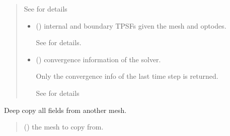 \documentclass[letterpaper,10pt,english]{sphinxmanual}
\begin{document}
\begin{fulllineitems}
\begin{fulllineitems}
\begin{quote}
\begin{description}
\begin{itemize}
\sphinxAtStartPar
See {\hyperref[\detokenize{_autosummary/nirfasterff.utils.SolverOptions:nirfasterff.utils.SolverOptions}]{}} for details


\end{itemize}

\sphinxAtStartPar
\begin{itemize}
\item {} 
\sphinxAtStartPar
{} () \textendash{} internal and boundary TPSFs given the mesh and optodes.

\sphinxAtStartPar
See {\hyperref[\detokenize{_autosummary/nirfasterff.base.data.TPSFdata:nirfasterff.base.data.TPSFdata}]{}} for details.

\item {} 
\sphinxAtStartPar
{} () \textendash{} convergence information of the solver.

\sphinxAtStartPar
Only the convergence info of the last time step is returned.

\sphinxAtStartPar
See {\hyperref[\detokenize{_autosummary/nirfasterff.utils.ConvergenceInfo:nirfasterff.utils.ConvergenceInfo}]{}} for details

\end{itemize}


\end{description}\end{quote}

\end{fulllineitems}


\begin{fulllineitems}
\label{\detokenize{_autosummary/nirfasterff.base.stnd_mesh.stndmesh:nirfasterff.base.stnd_mesh.stndmesh.from_copy}}
\pysigstartsignatures
{}
\pysigstopsignatures
\sphinxAtStartPar
Deep copy all fields from another mesh.
\begin{quote}\begin{description}
\sphinxAtStartPar
{} () \textendash{} the mesh to copy from.


\end{description}
\end{quote}
\end{fulllineitems}
\end{fulllineitems}
\end{document}
